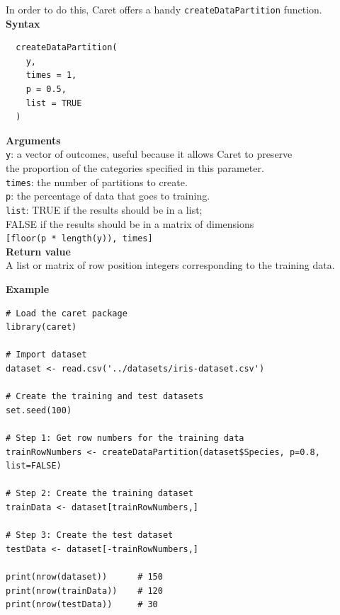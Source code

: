 \documentclass{article}
\begin{document}
In order to do this, Caret offers a handy \texttt{createDataPartition} function.\\

\textbf{Syntax}
\begin{verbatim}
  createDataPartition(
    y,
    times = 1,
    p = 0.5,
    list = TRUE
  )

\end{verbatim}

\textbf{Arguments}\\

\texttt{y}: a vector of outcomes, useful because it allows Caret to preserve\\
\phantom{....}the proportion of the categories specified in this parameter.\\
\texttt{times}: the number of partitions to create.\\
\texttt{p}: the percentage of data that goes to training.\\
\texttt{list}: TRUE if the results should be in a list;\\
\phantom{.........} FALSE if the results should be in a matrix of dimensions\\
\phantom{.........} \texttt{[floor(p * length(y)), times]}\\

\textbf{Return value}\\

A list or matrix of row position integers corresponding to the training data.\\

\pagebreak

\textbf{Example}\\
\begin{lstlisting}
# Load the caret package
library(caret)

# Import dataset
dataset <- read.csv('../datasets/iris-dataset.csv')

# Create the training and test datasets
set.seed(100)

# Step 1: Get row numbers for the training data
trainRowNumbers <- createDataPartition(dataset$Species, p=0.8, list=FALSE)

# Step 2: Create the training dataset
trainData <- dataset[trainRowNumbers,]

# Step 3: Create the test dataset
testData <- dataset[-trainRowNumbers,]

print(nrow(dataset))      # 150
print(nrow(trainData))    # 120
print(nrow(testData))     # 30
\end{lstlisting}
\end{document}
